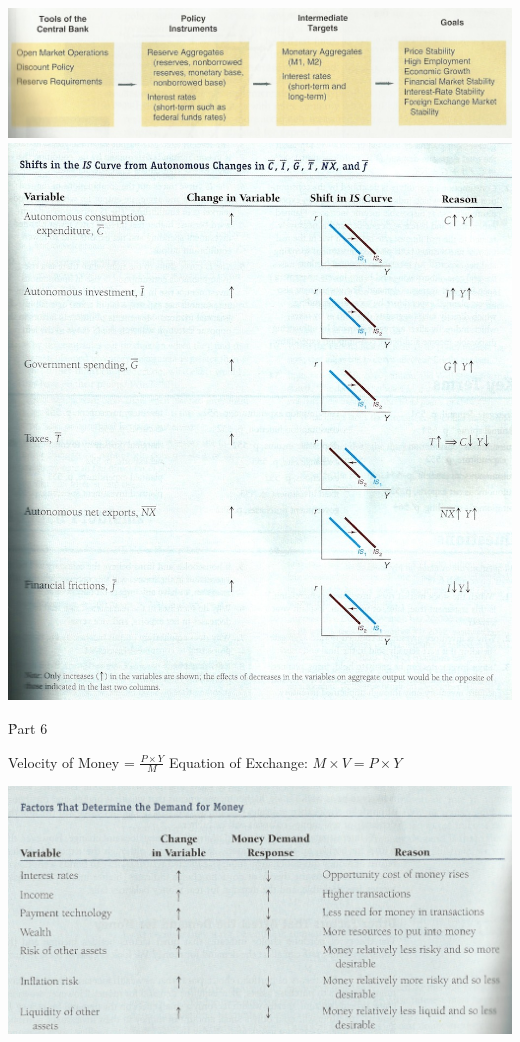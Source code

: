 \documentclass[12pt]{examnotes}
\begin{document}
\begin{center}
  \includegraphics[scale=0.5]{./imgs/chap17fig2.jpg}
  \includegraphics[scale=0.5]{./imgs/c21t1.jpg}
\end{center}


\h{Part 6}

Velocity of Money = $\displaystyle\frac{P \times Y}{M}$ 
Equation of Exchange: $M\times V=P \times Y$
\begin{center}
  \includegraphics[scale=0.5]{./imgs/c20t1.jpg}
\end{center}
\end{document}
